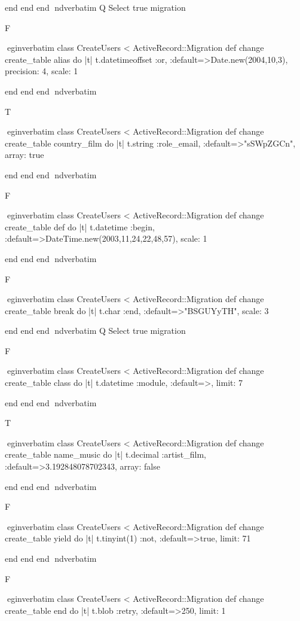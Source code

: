     end 
  end 
end
nd{verbatim}
Q
 Select true migration

F

egin{verbatim}
 class CreateUsers < ActiveRecord::Migration 
  def change 
    create_table alias do |t| 
      t.datetimeoffset :or, :default=>Date.new(2004,10,3), precision: 4, scale: 1
    
    end 
  end 
end
nd{verbatim}

T

egin{verbatim}
 class CreateUsers < ActiveRecord::Migration 
  def change 
    create_table country_film do |t| 
      t.string :role_email, :default=>"sSWpZGCn", array: true
    
    end 
  end 
end
nd{verbatim}

F

egin{verbatim}
 class CreateUsers < ActiveRecord::Migration 
  def change 
    create_table def do |t| 
      t.datetime :begin, :default=>DateTime.new(2003,11,24,22,48,57), scale: 1
    
    end 
  end 
end
nd{verbatim}

F

egin{verbatim}
 class CreateUsers < ActiveRecord::Migration 
  def change 
    create_table break do |t| 
      t.char :end, :default=>"BSGUYyTH", scale: 3
    
    end 
  end 
end
nd{verbatim}
Q
 Select true migration

F

egin{verbatim}
 class CreateUsers < ActiveRecord::Migration 
  def change 
    create_table class do |t| 
      t.datetime :module, :default=>, limit: 7
    
    end 
  end 
end
nd{verbatim}

T

egin{verbatim}
 class CreateUsers < ActiveRecord::Migration 
  def change 
    create_table name_music do |t| 
      t.decimal :artist_film, :default=>3.192848078702343, array: false
    
    end 
  end 
end
nd{verbatim}

F

egin{verbatim}
 class CreateUsers < ActiveRecord::Migration 
  def change 
    create_table yield do |t| 
      t.tinyint(1) :not, :default=>true, limit: 71
    
    end 
  end 
end
nd{verbatim}

F

egin{verbatim}
 class CreateUsers < ActiveRecord::Migration 
  def change 
    create_table end do |t| 
      t.blob :retry, :default=>250, limit: 1
    

